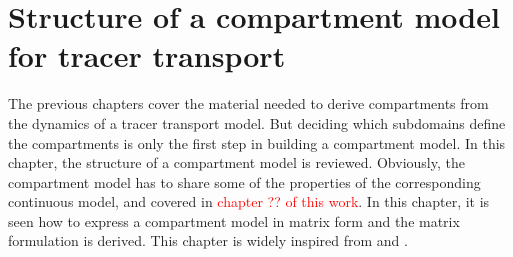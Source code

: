 \chapter{Structure of a compartment model for tracer transport} \label{chap:compartment}
The previous chapters cover the material needed to derive compartments from the dynamics of a tracer transport model. But deciding which subdomains define the compartments is only the first step in building a compartment model. In this chapter, the structure of a compartment model is reviewed. Obviously, the compartment model has to share some of the properties of the corresponding continuous model, and covered in \textcolor{red}{chapter ?? of this work}. In this chapter, it is seen how to express a compartment model in matrix form and the matrix formulation is derived. This chapter is widely inspired from \cite{deleersnijder2014compartment} and \cite{delhez2010compartment}.




